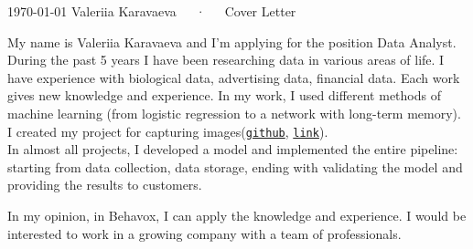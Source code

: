 \documentclass[11pt, a4paper]{awesome-cv}
\begin{document}
\makecvheader[R]

\makecvfooter
  {\today}
  {Valeriia Karavaeva~~~·~~~Cover Letter}
  {}

\makelettertitle

\begin{cvletter}

My name is Valeriia Karavaeva and I'm applying for the position Data Analyst.\\
During the past 5 years I have been researching data in various areas of life. I have experience with biological data, advertising data, financial data. Each work gives new knowledge and experience. 
In my work, I used different methods of machine learning (from logistic regression to a network with long-term memory). \\
I created my project for capturing images(\texttt{\href{https://github.com/ValeraKaravai/app_image_captioning}{github}}, \texttt{\href{https://lk-image-caprtioning.herokuapp.com/}{link}}).\\
In almost all projects, I developed a model and implemented the entire pipeline: starting from data collection, data storage, ending with validating the model and providing the results to customers.


In my opinion, in  Behavox, I can apply the knowledge and experience. I would be interested to work in a growing company with a team of professionals.

\end{cvletter}


\makeletterclosing
\end{document}
